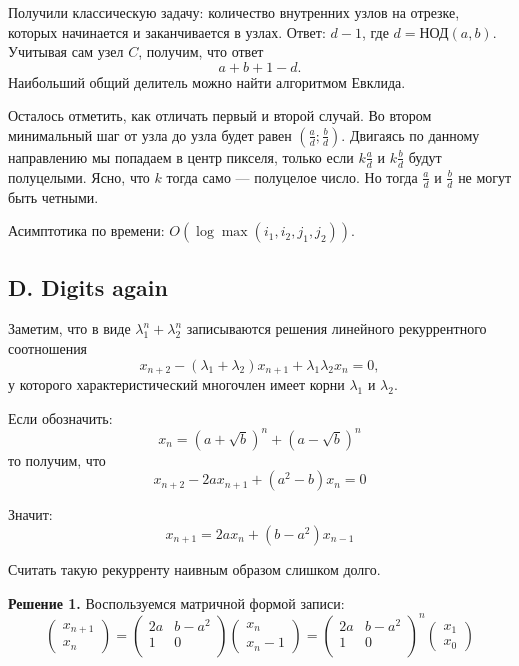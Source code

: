 \documentclass[12pt, a4paper]{article}
\begin{document}
Получили классическую задачу: количество внутренних узлов на отрезке, которых начинается и заканчивается в узлах. Ответ: $d - 1$, где $d = \text{НОД}(a, b)$. Учитывая сам узел $C$, получим, что ответ $$a + b + 1 - d.$$ Наибольший общий делитель можно найти алгоритмом Евклида.

Осталось отметить, как отличать первый и второй случай. Во втором минимальный шаг от узла до узла будет равен $\left(\frac{a}{d} ; \frac{b}{d} \right)$. Двигаясь по данному направлению мы попадаем в центр пикселя, только если $k \frac{a}{d}$ и $k \frac{b}{d}$ будут полуцелыми. Ясно, что $k$ тогда само --- полуцелое число. Но тогда $\frac{a}{d}$ и $\frac{b}{d}$ не могут быть четными.

Асимптотика по времени: $O(\log \max(i_1, i_2, j_1, j_2))$.


\newpage

\subsection*{D. Digits again}

Заметим, что в виде $\lambda_1^n + \lambda_2^n$ записываются решения линейного рекуррентного соотношения
$$ x_{n+2} - (\lambda_1 + \lambda_2) x_{n+1} + \lambda_1 \lambda_2 x_{n} = 0,$$
у которого характеристический многочлен имеет корни $\lambda_1$ и $\lambda_2$. 

Если обозначить:
$$x_n = \left(a+\sqrt{b} \right)^n + \left(a - \sqrt{b} \right)^n$$
то получим, что 
$$x_{n+2} - 2 a x_{n+1} + (a^2 - b) x_n = 0$$

Значит:
$$x_{n+1} = 2 a x_{n} + (b - a^2) x_{n-1}$$

Считать такую рекурренту наивным образом слишком долго. 

\textbf{Решение 1.} Воспользуемся матричной формой записи:
$$
\begin{pmatrix}
x_{n+1} \\
x_{n}
\end{pmatrix}
=
\begin{pmatrix}
2 a & b - a^2 \\
1 & 0 \\
\end{pmatrix}
\begin{pmatrix}
x_{n} \\
x_{n}-1
\end{pmatrix}
=
\begin{pmatrix}
2 a & b - a^2 \\
1 & 0 \\
\end{pmatrix}^{n}
\begin{pmatrix}
x_{1} \\
x_{0}
\end{pmatrix}
$$
\end{document}
